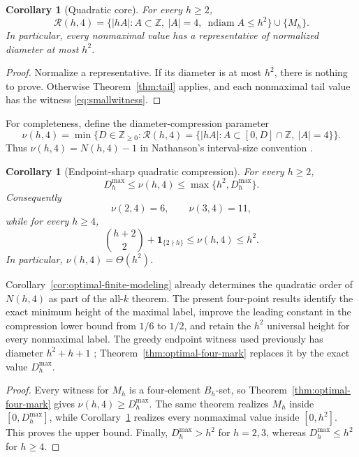 \documentclass[11pt,reqno]{amsart}
\newtheorem{corollary}[theorem]{Corollary}
\theoremstyle{definition}
\theoremstyle{remark}
\newcommand{\Z}{\mathbb Z}
\newcommand{\Rcal}{\mathcal R}
\newcommand{\ndiam}{\operatorname{ndiam}}
\begin{document}
\begin{corollary}[Quadratic core]\label{cor:core}
For every $h\geq2$,
\[
 \Rcal(h,4)=
 \{|hA|:A\subset\Z,\ |A|=4,\ \ndiam A\leq h^2\}\cup\{M_h\}.
\]
In particular, every nonmaximal value has a representative of normalized
diameter at most $h^2$.
\end{corollary}

\begin{proof}
Normalize a representative.  If its diameter is at most $h^2$, there is
nothing to prove.  Otherwise Theorem~\ref{thm:tail} applies, and each
nonmaximal tail value has the witness \eqref{eq:smallwitness}.
\end{proof}

For completeness, define the diameter-compression parameter
\[
 \nu(h,4)=\min\{D\in\mathbb Z_{\geq0}:\Rcal(h,4)=
 \{|hA|:A\subset[0,D]\cap\Z,\ |A|=4\}\}.
\]
Thus $\nu(h,4)=N(h,4)-1$ in Nathanson's interval-size convention
\cite{NathansonCompression}.

\begin{corollary}[Endpoint-sharp quadratic compression]
\label{cor:compression}
For every $h\geq2$,
\begin{equation}\label{eq:compressionbounds}
 D_h^{\max}\leq\nu(h,4)\leq\max\{h^2,D_h^{\max}\}.
\end{equation}
Consequently
\[
 \nu(2,4)=6,\qquad \nu(3,4)=11,
\]
while for every $h\geq4$,
\[
 \binom{h+2}{2}+\mathbf 1_{\{2\nmid h\}}
 \leq\nu(h,4)\leq h^2.
\]
In particular, $\nu(h,4)=\Theta(h^2)$.
\end{corollary}

Corollary~\ref{cor:optimal-finite-modeling} already determines the
quadratic order of $N(h,4)$ as part of the all-$k$ theorem.  The present
four-point results identify the exact minimum height of the maximal label,
improve the leading constant in the compression lower bound from $1/6$ to
$1/2$, and retain the $h^2$ universal height for every nonmaximal label.
The greedy endpoint witness used previously has diameter $h^2+h+1$
\cite{NathansonGreedyThird}; Theorem~\ref{thm:optimal-four-mark} replaces it
by the exact value $D_h^{\max}$.

\begin{proof}
Every witness for $M_h$ is a four-element $B_h$-set, so
Theorem~\ref{thm:optimal-four-mark} gives
$\nu(h,4)\geq D_h^{\max}$.  The same theorem realizes $M_h$ inside
$[0,D_h^{\max}]$, while Corollary~\ref{cor:core} realizes every nonmaximal
value inside $[0,h^2]$.  This proves the upper bound.  Finally,
$D_h^{\max}>h^2$ for $h=2,3$, whereas $D_h^{\max}\leq h^2$ for
$h\geq4$.
\end{proof}
\end{document}
